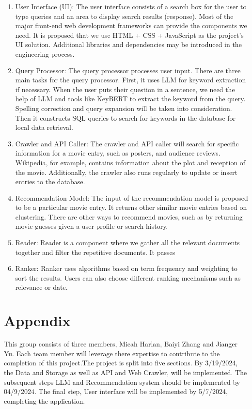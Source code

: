 \documentclass[journal]{IEEEtran}
\begin{document}
\begin{enumerate}
    \item  {User Interface (UI)}: The user interface consists of a search box for the user to type queries and an area to display search results (response). Most of the major front-end web development frameworks can provide the components we need. It is proposed that we use HTML + CSS + JavaScript as the project’s UI solution. Additional libraries and dependencies may be introduced in the engineering process.

    \item {Query Processor}: The query processor processes user input. There are three main tasks for the query processor. First, it uses LLM for keyword extraction if necessary. When the user puts their question in a sentence, we need the help of LLM and tools like KeyBERT to extract the keyword from the query. Spelling correction and query expansion will be taken into consideration. Then it constructs SQL queries to search for keywords in the database for local data retrieval.

    \item {Crawler and API Caller}: The crawler and API caller will search for specific information for a movie entry, such as posters, and audience reviews. Wikipedia, for example, contains information about the plot and reception of the movie. Additionally, the crawler also runs regularly to update or insert entries to the database.

    \item {Recommendation Model}: The input of the recommendation model is proposed to be a particular movie entry. It returns other similar movie entries based on clustering. There are other ways to recommend movies, such as by returning movie guesses given a user profile or search history.

    \item {Reader}: Reader is a component where we gather all the relevant documents together and filter the repetitive documents. It passes 

    \item {Ranker}: Ranker uses algorithms based on term frequency and weighting to sort the results. Users can also choose different ranking mechanisms such as relevance or date.
\end{enumerate}

\section{Appendix}
This group consists of three members, Micah Harlan, Baiyi Zhang and Jianger Yu. Each team member will leverage there expertise to contribute to the completion of this project.The project is split into five sections. By 3/19/2024, the Data and Storage as well as API and Web Crawler, will be implemented. The subsequent steps LLM and Recommendation system should be implemented by 04/9/2024. The final step, User interface will be implemented by 5/7/2024, completing the application.



\end{document}
